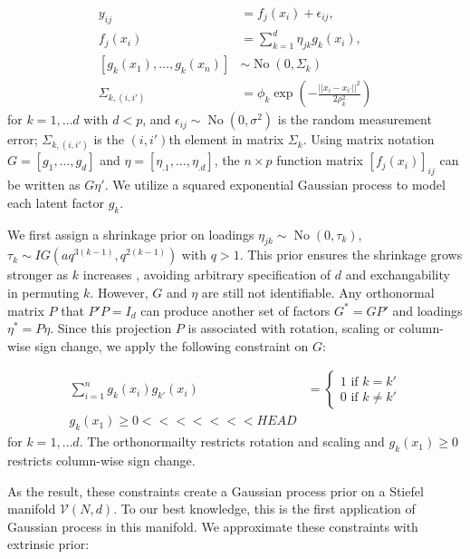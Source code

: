 \documentclass[10pt]{article}
\newcommand{\mc}[1]{\mathcal{#1}}
\DeclareMathOperator{\No}{No}
\DeclareMathOperator{\1}{\mathbbm{1}}
\begin{document}
\begin{equation*}
\begin{aligned}
y_{ij} & = f_j(x_i) + \epsilon_{ij},\\
 f_j(x_i) & = \sum_{k=1}^{d} \eta_{jk} g_k(x_i),\\
 \left [ g_k(x_1) , \ldots , g_k(x_n) \right] &\sim \No (0, \Sigma_k)\\
\Sigma_{k,(i,i')} &= \phi_k\exp( - \frac{||x_i-x_{i'}||^2}{2\rho_k^2})
\end{aligned}
\end{equation*}
for $k=1,\ldots d$ with $d<p$, and $\epsilon_{ij}\sim \No(0,\sigma^2)$ is the random measurement error; $\Sigma_{k,(i,i')}$ is the $(i,i')$th element in matrix $\Sigma_k$. Using matrix notation $G=[g_1, \ldots, g_d]$ and $\eta= [\eta_{.1},\ldots,\eta_{.d}]$, the $n\times p$ function matrix $[f_j(x_i)]_{ij}$ can be written as $G \eta'$. We utilize a squared exponential Gaussian process to model each latent factor $g_k$.

We first assign a shrinkage prior on loadings $\eta_{jk}\sim \No(0,\tau_k)$, $\tau_k \sim IG(aq^{3(k-1)},q^{2(k-1)})$  with $q>1$. This prior ensures the shrinkage grows stronger as $k$ increases \citep{bhattacharya2011sparse}, avoiding arbitrary specification of $d$ and exchangability in permuting $k$. However, $G$ and $\eta$ are still not identifiable. Any orthonormal matrix $P$ that $P'P = I_d$ can produce another set of factors $G^*= GP'$ and loadings $\eta^* = P\eta$. Since this projection $P$ is associated with rotation, scaling or column-wise sign change, we apply the following constraint on $G$:

\begin{equation*}
\begin{aligned}
 \sum_{i=1}^n g_k(x_i) g_{k'}(x_i) &= \left\{ \begin{array}{cc}1 \text{ if } k=k' \\ 0 \text{ if } k \neq k'\end{array}\right. \\
 g_k(x_1) \ge 0
<<<<<<< HEAD
\end{aligned}
\end{equation*}
for $k=1,\ldots d$. The orthonormailty restricts rotation and scaling and $g_k(x_1)\ge 0$ restricts column-wise sign change. 

As the result, these constraints create a Gaussian process prior on a Stiefel manifold $\mc V(N,d)$. To our best knowledge, this is the first application of Gaussian process in this manifold. We approximate these constraints with extrinsic prior:
\end{document}
